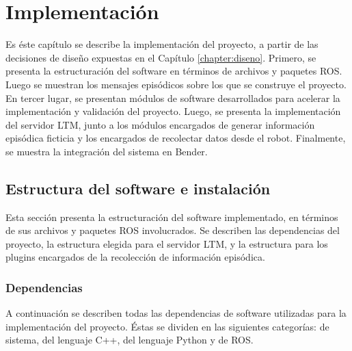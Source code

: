\chapter{Implementación}\label{chapter:implementacion}

Es éste capítulo se describe la implementación del proyecto, a partir de las decisiones de diseño expuestas en el Capítulo \ref{chapter:diseno}. Primero, se presenta la estructuración del software en términos de archivos y paquetes ROS. Luego se muestran los mensajes episódicos sobre los que se construye el proyecto. En tercer lugar, se presentan módulos de software desarrollados para acelerar la implementación y validación del proyecto. Luego, se presenta la implementación del servidor LTM, junto a los módulos encargados de generar información episódica ficticia y los encargados de recolectar datos desde el robot. Finalmente, se muestra la integración del sistema en Bender.

\section{Estructura del software e instalación}

Esta sección presenta la estructuración del software implementado, en términos de sus archivos y paquetes ROS involucrados. Se describen las dependencias del proyecto, la estructura elegida para el servidor LTM, y la estructura para los plugins encargados de la recolección de información episódica.

\subsection{Dependencias}

A continuación se describen todas las dependencias de software utilizadas para la implementación del proyecto. Éstas se dividen en las siguientes categorías: de sistema, del lenguaje C++, del lenguaje Python y de ROS.

